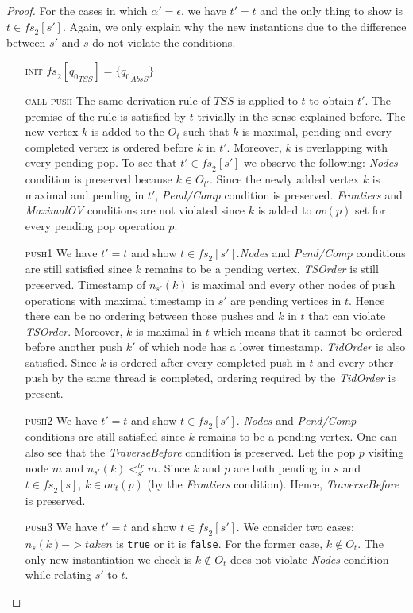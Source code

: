 \begin{proof}
For the cases in which $\alpha' = \epsilon$, we have $t'=t$ and the only thing to show is $t \in \mathit{fs}_2[s']$. Again, we only explain why the new instantions due to the difference between $s'$ and $s$ do not violate the conditions.
\begin{itemize}
\item[\textsc{init}] $\mathit{fs}_2[{q_0}_{TSS}] =\{{q_0}_{AbsS}\}$
\item[\textsc{call-push}] The same derivation rule of $TSS$ is applied to $t$  to obtain $t'$. The premise of the rule is satisfied by $t$ trivially in the sense explained before. The new vertex $k$ is added to the $O_t$ such that $k$ is maximal, pending and every completed vertex is ordered before $k$ in $t'$. Moreover, $k$ is overlapping with every pending pop. To see that $t' \in \mathit{fs}_2[s']$ we observe the following: \emph{Nodes} condition is preserved because $k \in O_{t'}$. Since the newly added vertex $k$ is maximal and pending in $t'$, \emph{Pend/Comp} condition is preserved. \emph{Frontiers} and \emph{MaximalOV} conditions are not violated since $k$ is added to $ov(p)$ set for every pending pop operation $p$. 
\item[\textsc{push1}] We have $t' = t$ and show $t \in \mathit{fs}_2[s']$.\emph{Nodes} and \emph{Pend/Comp} conditions are still satisfied since $k$ remains to be a pending vertex. \emph{TSOrder} is still preserved. Timestamp of $n_{s'}(k)$ is maximal and every other nodes of push operations with maximal timestamp in $s'$ are pending vertices in $t$. Hence there can be no ordering between those pushes and $k$ in $t$ that can violate \emph{TSOrder}. Moreover, $k$ is maximal in $t$ which means that it cannot be ordered before another push $k'$ of which node has a lower timestamp. \emph{TidOrder} is also satisfied. Since $k$ is ordered after every completed push in $t$ and every other push by the same thread is completed, ordering required by the \emph{TidOrder} is present.
\item[\textsc{push2}] We have $t' = t$ and show $t \in \mathit{fs}_2[s']$. \emph{Nodes} and \emph{Pend/Comp} conditions are still satisfied since $k$ remains to be a pending vertex. One can also see that the \emph{TraverseBefore} condition is preserved. Let the pop $p$ visiting node $m$ and $n_{s'}(k) <^{tr}_{s'} m$. Since $k$ and $p$ are both pending in $s$ and $t \in \mathit{fs}_2[s]$, $k \in ov_t(p)$ (by the \emph{Frontiers} condition). Hence, \emph{TraverseBefore} is preserved. 
\item[\textsc{push3}] We have $t' = t$ and show $t \in \mathit{fs}_2[s']$. We consider two cases: $n_s(k)->taken$ is \texttt{true} or it is \texttt{false}. For the former case, $k \notin O_t$. The only new instantiation we check is $k \notin O_t$ does not violate \emph{Nodes} condition while relating $s'$ to $t$. 


\end{itemize}
\end{proof}
